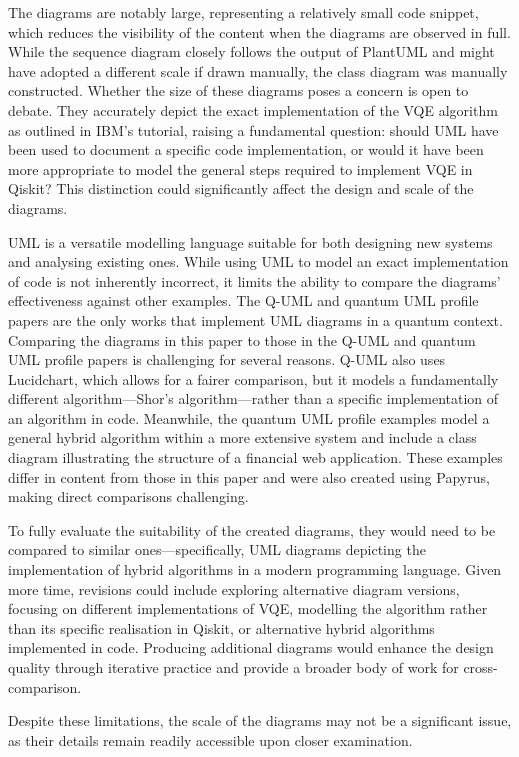 \documentclass{article}
\begin{document}
The diagrams are notably large, representing a relatively small code snippet, which reduces the visibility of the content when the diagrams are observed in full. While the sequence diagram closely follows the output of PlantUML and might have adopted a different scale if drawn manually, the class diagram was manually constructed. Whether the size of these diagrams poses a concern is open to debate. They accurately depict the exact implementation of the VQE algorithm as outlined in IBM's tutorial, raising a fundamental question: should UML have been used to document a specific code implementation, or would it have been more appropriate to model the general steps required to implement VQE in Qiskit? This distinction could significantly affect the design and scale of the diagrams.

UML is a versatile modelling language suitable for both designing new systems and analysing existing ones. While using UML to model an exact implementation of code is not inherently incorrect, it limits the ability to compare the diagrams' effectiveness against other examples. The Q-UML and quantum UML profile papers are the only works that implement UML diagrams in a quantum context. Comparing the diagrams in this paper to those in the Q-UML and quantum UML profile papers is challenging for several reasons. Q-UML also uses Lucidchart, which allows for a fairer comparison, but it models a fundamentally different algorithm—Shor's algorithm—rather than a specific implementation of an algorithm in code.
Meanwhile, the quantum UML profile examples model a general hybrid algorithm within a more extensive system and include a class diagram illustrating the structure of a financial web application\cite{Pérez-Castillo2022}. These examples differ in content from those in this paper and were also created using Papyrus, making direct comparisons challenging.

To fully evaluate the suitability of the created diagrams, they would need to be compared to similar ones—specifically, UML diagrams depicting the implementation of hybrid algorithms in a modern programming language. Given more time, revisions could include exploring alternative diagram versions, focusing on different implementations of VQE, modelling the algorithm rather than its specific realisation in Qiskit, or alternative hybrid algorithms implemented in code. Producing additional diagrams would enhance the design quality through iterative practice and provide a broader body of work for cross-comparison.

Despite these limitations, the scale of the diagrams may not be a significant issue, as their details remain readily accessible upon closer examination.
\end{document}
